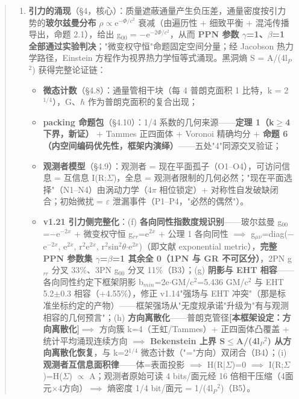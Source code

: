 \documentclass[12pt]{article}
\newcommand{\mtag}[1]{\textbf{[#1]}}
\newcommand{\up}[1]{\ensuremath{^{#1}}}
\newcommand{\down}[1]{\ensuremath{_{#1}}}
\begin{document}
\begin{abstract}
\begin{enumerate}
\item \textbf{引力的涌现}（\S{}4，核心）：质量遮蔽通量产生负压差，通量密度按引力势的\textbf{玻尔兹曼分布} \ensuremath{\rho}\ensuremath{\propto}e\up{-\Phi{}/c^{2}} 衰减（由遍历性 + 细致平衡 + 混沌传播导出，命题 2.1），给出 g\down{00} = \ensuremath{-}e\up{-2\Phi{}/c^{2}}，从而 \textbf{PPN 参数 \ensuremath{\gamma}=1、\ensuremath{\beta}=1 全部通过实验判决}；"微变权守恒"命题固定空间分量；经 Jacobson 热力学路径，Einstein 方程作为视界热力学恒等式涌现。黑洞熵 S = A/(4l\down{P}\up{2}) 获得完整论证链：
\begin{itemize}
\item \textbf{微态计数}（\S{}4.8）：通量管相干块（每 4 普朗克面积 1 比特，k = 2\up{1/4}），G、\ensuremath{\hbar} 作为普朗克面积的复合出现；
\item \textbf{packing 命题包}（\S{}4.10）：1/4 系数的几何来源------\textbf{定理 1（k\ensuremath{\geq}4 下界，新证）} + Tammes 正四面体 + Voronoi 精确均分 + \textbf{命题 6（内空间编码优先性，框架内演绎）}------五处"4"同源交叉验证；
\item \textbf{观测者模型}（\S{}4.9）：观测者 = 现在平面孤子（O1--O4），可访问信息 = 互信息 I(R;\ensuremath{\Sigma})，全息 = 观测者限制的几何必然；"现在平面选择"（N1--N4）由涡动力学（4\ensuremath{\pi} 相位锁定）+ 对称性自发破缺闭合；初始微扰 = \ensuremath{\varepsilon} 泄漏事件（P1--P4，"必然的偶然"）。
\item \textbf{v1.21 引力侧完整化}：(f) \textbf{各向同性指数度规识别}------玻尔兹曼 g\down{00}=\ensuremath{-}e\up{-2x} + 微变权守恒 g\down{rr}=e\up{2x} + 公理 1 各向同性 \ensuremath{\implies} g\down{\mu{}\nu{}}=diag(\ensuremath{-}e\up{-2x}, e\up{2x}, r\up{2}e\up{2x}, r\up{2}sin\up{2}\ensuremath{\theta}\ensuremath{\cdot}e\up{2x})（即文献 exponential metric），\textbf{完整 PPN 参数集 \ensuremath{\gamma}=\ensuremath{\beta}=1 其余全 0（1PN 与 GR 不可区分）}，2PN g\down{rr} 分叉 33\%、3PN g\down{00} 分叉 11\%（B3）；(g) \textbf{阴影与 EHT 相容}------各向同性约定下框架阴影 b\down{min}=2e\ensuremath{\cdot}GM/c\up{2}=5.436 GM/c\up{2} 与 EHT 5.2\ensuremath{\pm}0.3 相容（+4.55\%），修正 v1.14"强场与 EHT 冲突"（那是标准坐标约定的产物）------框架强场从"无度规承诺"升级为"有与观测相容的几何预言"；(h) \textbf{方向离散化}------普朗克管径\mtag{本框架设定：方向离散化}\ensuremath{\implies} 方向簇 k=4（王虹/Tammes）+ 正四面体凸覆盖 + 统计平均涌现连续方向 \ensuremath{\implies} \textbf{Bekenstein 上界 S\ensuremath{\leq}A/(4l\down{P}\up{2}) 从方向离散化恢复}，与 k=2\up{1/4} 微态计数（"="方向）双闭合（B4）；(i) \textbf{观测者互信息面积律}------体=表面投影 \ensuremath{\implies} H(R|\ensuremath{\Sigma})=0 \ensuremath{\implies} I(R;\ensuremath{\Sigma})=H(\ensuremath{\Sigma}) \ensuremath{\propto} A；观测者原始可读 4 bits/面元经 16 倍相干压缩（4面元\ensuremath{\times}4方向）\ensuremath{\implies} 熵密度 1/4 bit/面元 = 1/(4l\down{P}\up{2})（B5）。
\end{itemize}
\end{enumerate}


\end{abstract}
\end{document}
